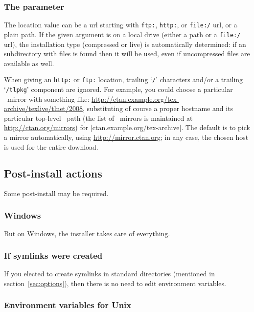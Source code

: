 \documentclass{article}
\begin{document}
\subsubsection{The  parameter}
\label{sec:location}

The location value can be a url starting with \texttt{ftp:},
\texttt{http:}, or \texttt{file:/} url, or a plain path.  If the given
argument is on a local drive (either a path or a \texttt{file:/} url),
the installation type (compressed or live) is automatically determined:
if an  subdirectory with  files is
found then it will be used, even if uncompressed files are available as
well.

When giving an \texttt{http:} or \texttt{ftp:} location, trailing
`\texttt{/}' characters and/or a trailing `\texttt{/tlpkg}' component
are ignored.  For example, you could choose a particular \CTAN\ mirror
with something like:
\url{http://ctan.example.org/tex-archive/texlive/tlnet/2008},
substituting of course a proper hostname and its particular top-level
\CTAN\ path (the list of \CTAN\ mirrors is maintained at
\url{http://ctan.org/mirrors}) for |ctan.example.org/tex-archive|. The
default is to pick a mirror automatically, using
\url{http://mirror.ctan.org}; in any case, the chosen host is used for
the entire download.


\subsection{Post-install actions}
\label{sec:postinstall}

Some post-install may be required.

\subsubsection{Windows}

But on Windows, the installer takes care of everything.

\subsubsection{If symlinks were created}

If you elected to create symlinks in standard directories (mentioned in
section~\ref{sec:options}), then there is no need to edit environment
variables.

\subsubsection{Environment variables for Unix}
\label{sec:env}
\end{document}
